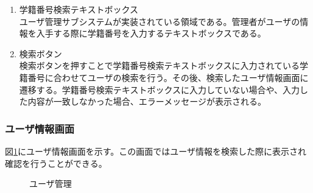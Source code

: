 \documentclass[a4j]{jarticle}
\begin{document}
\begin{enumerate}
  \renewcommand{\labelenumi}{\textcircled{\scriptsize \theenumi}}

\item 学籍番号検索テキストボックス\\
ユーザ管理サブシステムが実装されている領域である。管理者がユーザの情報を入手する際に学籍番号を入力するテキストボックスである。

\item 検索ボタン\\
検索ボタンを押すことで学籍番号検索テキストボックスに入力されている学籍番号に合わせてユーザの検索を行う。その後、検索したユーザ情報画面に遷移する。学籍番号検索テキストボックスに入力していない場合や、入力した内容が一致しなかった場合、エラーメッセージが表示される。


\end{enumerate}


\subsubsection{ユーザ情報画面}
図\ref{fig:user_info}にユーザ情報画面を示す。この画面ではユーザ情報を検索した際に表示され確認を行うことができる。
\begin{figure}[H]
\centering
{}
\caption{ユーザ管理}
\label{fig:user_info}
\end{figure}
\end{document}
